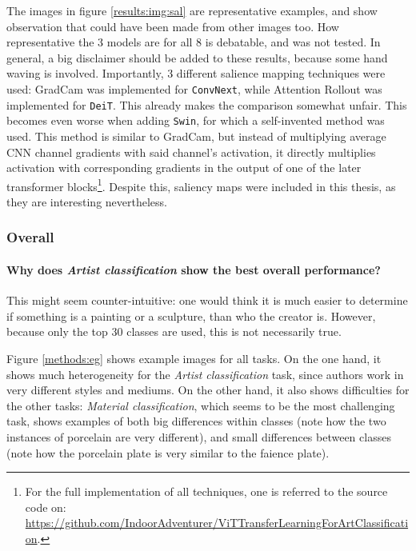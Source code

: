 The images in figure \ref{results:img:sal} are representative examples, and show observation that could have been made from other images too. How representative the 3 models are for all 8 is debatable, and was not tested. In general, a big disclaimer should be added to these results, because some hand waving is involved. Importantly, 3 different salience mapping techniques were used: GradCam \citep{selvaraju2017grad} was implemented for \texttt{ConvNext}, while Attention Rollout \citep{abnar2020quantifying} was implemented for \texttt{DeiT}. This already makes the comparison somewhat unfair. This becomes even worse when adding \texttt{Swin}, for which a self-invented method was used. This method is similar to GradCam, but instead of multiplying average CNN channel gradients with said channel's activation, it directly multiplies activation with corresponding gradients in the output of one of the later transformer blocks\footnote{For the full implementation of all techniques, one is referred to the source code on: \\ \url{https://github.com/IndoorAdventurer/ViTTransferLearningForArtClassification}.}. Despite this, saliency maps were included in this thesis, as they are interesting nevertheless.

\subsubsection{Overall}

\paragraph{Why does \textit{Artist classification} show the best overall performance?}
This might seem counter-intuitive: one would think it is much easier to determine if something is a painting or a sculpture, than who the creator is. However, because only the top 30 classes are used, this is not necessarily true.

Figure \ref{methods:eg} shows example images for all tasks. On the one hand, it shows much heterogeneity for the \textit{Artist classification} task, since authors work in very different styles and mediums. On the other hand, it also shows difficulties for the other tasks: \textit{Material classification}, which seems to be the most challenging task, shows examples of both big differences within classes (note how the two instances of porcelain are very different), and small differences between classes (note how the porcelain plate is very similar to the faience plate).

